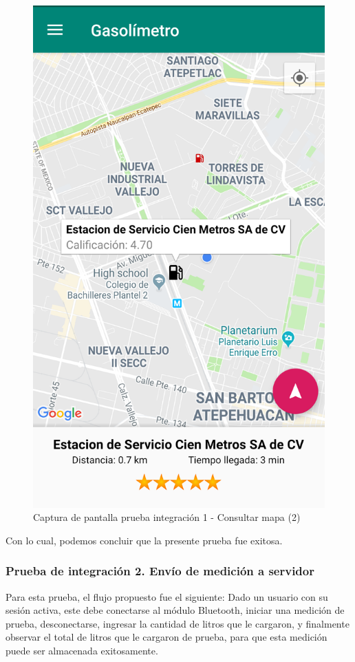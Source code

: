 \begin{figure}[H]
	\centering
	\includegraphics[scale=.2]{Capitulo6/integracion/software/images/4}
	\caption{Captura de pantalla prueba integración 1 - Consultar mapa (2)}
	\label{fig:int4}
\end{figure}

Con lo cual, podemos concluir que la presente prueba fue exitosa.


\subsubsection{Prueba de integración 2. Envío de medición a servidor}
Para esta prueba, el flujo propuesto fue el siguiente: Dado un usuario con su sesión activa, este debe conectarse al módulo Bluetooth, iniciar una medición de prueba, desconectarse, ingresar la cantidad de litros que le cargaron, y finalmente observar el total de litros que le cargaron de prueba, para que esta medición puede ser almacenada exitosamente.\\

